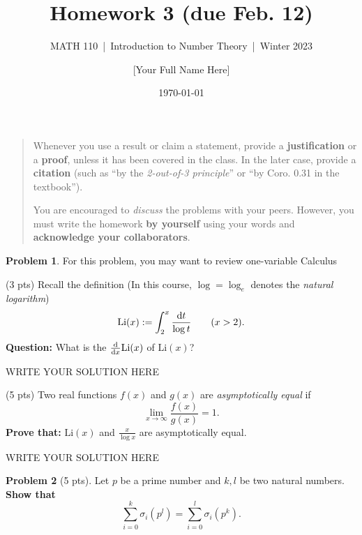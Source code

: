 \documentclass[11pt]{article}
\title{Homework 3 (due Feb. 12)}
\author{[Your Full Name Here]}
\subtitle{MATH 110~|~Introduction to Number Theory~|~Winter 2023}
\date{\today}
\theoremstyle{plain}
\theoremstyle{definition}
\newtheorem{problem}{Problem}
\theoremstyle{remark}
\numberwithin{equation}{problem}
\begin{document}
\maketitle

\begin{quotation}
	Whenever you use a result or claim a statement, provide a \textbf{justification} or a \textbf{proof}, unless it has been covered in the class. In the later case, provide a \textbf{citation} (such as ``by the \emph{2-out-of-3 principle}'' or ``by Coro. 0.31 in the textbook'').

	You are encouraged to \emph{discuss} the problems with your peers. However, you must write the homework \textbf{by yourself} using your words and \textbf{acknowledge your collaborators}.
\end{quotation}


\begin{problem}
	For this problem, you may want to review one-variable Calculus
	\begin{listinprob}
		\item (3 pts) Recall the definition (In this course, $\log=\log_{e}$ denotes the \emph{natural logarithm})
									\[
										\mathrm{Li}(x):=
											\int_{2}^{x}\frac{\odif{t}}{\log{t}}
										\qquad (x>2).
									\]
									\textbf{Question:} What is the  $\odv*{}{x}\mathrm{Li}(x)$ of $\mathrm{Li}(x)$?
		
\begin{solution} %
WRITE YOUR SOLUTION HERE
\end{solution}\clearpage %

		\item (5 pts) Two real functions $f(x)$ and $g(x)$ are \emph{asymptotically equal} if 
		\[
			\lim_{x\to\infty} \frac{f(x)}{g(x)} = 1.
		\]
		\textbf{Prove that:} $\mathrm{Li}(x)$ and $\frac{x}{\log{x}}$ are asymptotically equal.
	\end{listinprob}
\end{problem}
		
\begin{solution} %
WRITE YOUR SOLUTION HERE
\end{solution}\clearpage %


\begin{problem}[5 pts]
	Let $p$ be a prime number and $k,l$ be two natural numbers. 
	\textbf{Show that} 
	\[
		\sum_{i=0}^{k}\sigma_{i}(p^l) = \sum_{i=0}^{l}\sigma_{i}(p^k).
	\]
\end{problem}
		
\end{document}
